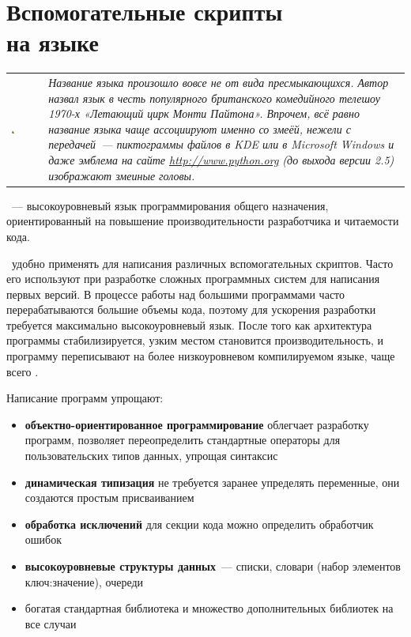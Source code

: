 \chapter{Вспомогательные скрипты\\ на языке \py}

\begin{tabular}{p{} p{}}
\includegraphics[width=0.1\textwidth]{python/logo.png}&
\emph{
Название языка произошло вовсе не от вида пресмыкающихся. Автор назвал язык в
честь популярного британского комедийного телешоу 1970-х «Летающий цирк Монти
Пайтона». Впрочем, всё равно название языка чаще ассоциируют именно со змеёй,
нежели с передачей\ --- пиктограммы файлов в KDE или в Microsoft Windows и даже
эмблема на сайте \url{http://www.python.org} (до выхода версии 2.5) изображают
змеиные головы.
}
\\
\end{tabular}
\bigskip

\py{}\ --- высокоуровневый язык программирования общего
назначения, ориентированный на повышение производительности разработчика и
читаемости кода.

\py\ удобно применять для написания различных вспомогательных скриптов.
Часто его используют при разработке сложных программных систем для написания
первых версий. В процессе работы над большими программами часто перерабатываются
большие объемы кода, поэтому для ускорения разработки требуется максимально
высокоуровневый язык. После того как архитектура программы стабилизируется,
узким местом становится производительность, и программу переписывают на более
низкоуровневом компилируемом языке, чаще всего \cpp.

Написание программ упрощают:

\begin{itemize}
  \item \textbf{объектно-ориентированное программирование} облегчает разработку
  программ, позволяет переопределить стандартные операторы для пользовательских
  типов данных, упрощая синтаксис
  \item \textbf{динамическая типизация} не требуется заранее упределять
  переменные, они создаются простым присваиванием
  \item \textbf{обработка исключений} для секции кода можно определить
  обработчик ошибок
  \item \textbf{высокоуровневые структуры данных}\ --- списки, словари (набор
  элементов ключ:значение), очереди
  \item богатая стандартная библиотека и множество дополнительных библиотек на
  все случаи
\end{itemize}

